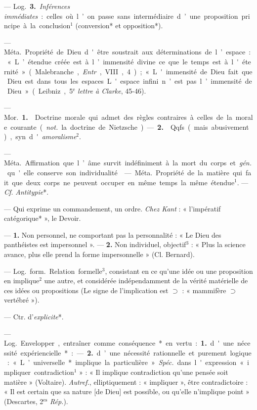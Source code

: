 \begin{itemize}[leftmargin=1cm, label=, itemsep=1pt]
— \si{Log.} {\bf 3.} {\it Inférences immédiates} : celles où l’on passe sans
intermédiaire d’une proposition principe à la conclusion$^1$ (conversion* et
opposition*).

 — \si{Méta.} Propriété de Dieu d'être soustrait aux
déterminations de l’espace : « L’étendue créée est à l’immensité divine ce
que le temps est à l'éternité » (Malebranche, {\it Entr}., VIII, 4) ;
« L'immensité de Dieu fait que Dieu est dans tous les espaces. L'espace
infini n’est pas l’immensité de Dieu » (Leibniz, 5$^\text{e}$ {\it lettre à
Clarke}, 45-46).

 — \si{Mor.} {\bf 1.}  Doctrine morale qui
admet des règles contraires à celles de la morale courante ({\it not.} la
doctrine de Nietzsche). — {\bf 2.}  Qqfs. (mais abusivement),
syn. d'{\it amoralisme}$^2$.

 — \si{Méta.} Affirmation que l’âme survit
indéfiniment à la mort du corps et {\it gén.} qu'elle conserve son
individualité.

 — \si{Méta.} Propriété de la matière qui fait que deux
corps ne peuvent occuper en même temps la même étendue$^1$. — {\it Cf.}
{\it Antitypie}*.

 — Qui exprime un commandement, un ordre. {\it Chez Kant} :
« l'impératif catégorique* », le Devoir.

 — {\bf 1.} Non personnel, ne comportant pas la
personnalité : « Le Dieu des panthéistes est impersonnel ». — {\bf 2.} Non
individuel, objectif$^3$ : « Plus la science avance, plus elle prend la forme
impersonnelle » (Cl. Bernard).

 — \si{Log.} \si{form.} Relation formelle$^3$, consistant en
ce qu’une idée ou une proposition en implique$^2$ une autre, et considérée
indépendamment de la vérité matérielle de ces idées ou propositions (Le signe
de l’implication est $\supset$ : « mammifère $\supset$ vertébré »).

 — Ctr. d'{\it explicite}*.

 — \si{Log.} Envelopper, entraîner comme conséquence* en
vertu : {\bf 1.} d'une nécessité expériencielle*: — {\bf 2.} d’une nécessité
rationnelle et purement logique : « L’universelle* implique la
particulière ». {\it Spéc.} dans l'expression « impliquer
contradiction$^1$ » : « Il implique contradiction qu’une pensée soit
matière » (Voltaire). {\it Autref.}, elliptiquement : « impliquer », être
contradictoire : « Il est certain que sa nature [de Dieu] est possible, ou
qu'elle n'implique point » (Descartes, 2$^\text{es}$ {\it Rép.}).


\end{itemize}
